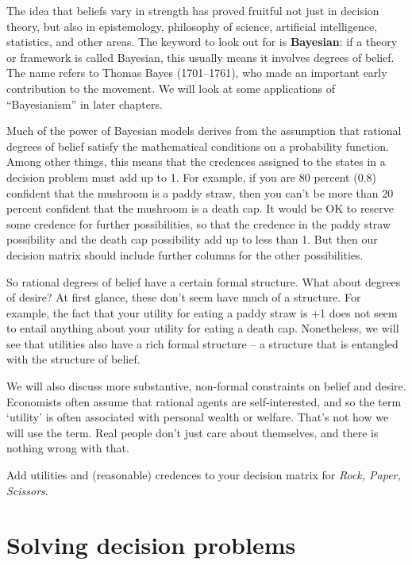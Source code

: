 The idea that beliefs vary in strength has proved fruitful not just in
decision theory, but also in epistemology, philosophy of science,
artificial intelligence, statistics, and other areas. The keyword to
look out for is \textbf{Bayesian}: if a theory or framework is called
Bayesian, this usually means it involves degrees of belief. The name
refers to Thomas Bayes (1701--1761), who made an important early
contribution to the movement. We will look at some applications of
``Bayesianism'' in later chapters.

Much of the power of Bayesian models derives from the assumption that
rational degrees of belief satisfy the mathematical conditions on a
probability function. Among other things, this means that the
credences assigned to the states in a decision problem must add up to
1. For example, if you are 80 percent (0.8) confident that the
mushroom is a paddy straw, then you can't be more than 20 percent
confident that the mushroom is a death cap. It would be OK to
reserve some credence for further possibilities, so that the credence
in the paddy straw possibility and the death cap possibility add up to
less than 1. But then our decision matrix should include further
columns for the other possibilities.

So rational degrees of belief have a certain formal structure.  What
about degrees of desire? At first glance, these don't seem have much
of a structure. For example, the fact that your utility for eating a
paddy straw is +1 does not seem to entail anything about your utility
for eating a death cap. Nonetheless, we will see that utilities also
have a rich formal structure -- a structure that is entangled with the
structure of belief.

We will also discuss more substantive, non-formal constraints on
belief and desire. Economists often assume that rational agents are
self-interested, and so the term `utility' is often associated with
personal wealth or welfare. That's not how we will use the term. Real
people don't just care about themselves, and there is nothing wrong
with that.

\begin{exercise}{1}
  Add utilities and (reasonable) credences to your decision matrix for
  \emph{Rock, Paper, Scissors}. 
\end{exercise}

\section{Solving decision problems}\label{sec:solving}

